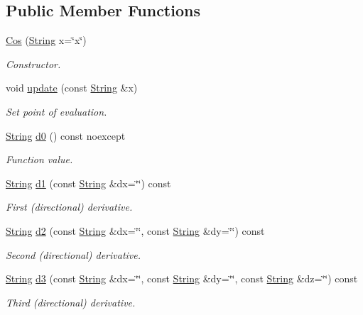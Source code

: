 \subsection*{Public Member Functions}
\begin{DoxyCompactItemize}
\item 
\hyperlink{structFunG_1_1stringify_1_1Cos_a6d3500463ccf52c1a7a8947ff69ffc65}{Cos} (\hyperlink{structFunG_1_1String}{String} x=\char`\"{}x\char`\"{})
\begin{DoxyCompactList}\small\item\em Constructor. \end{DoxyCompactList}\item 
void \hyperlink{structFunG_1_1stringify_1_1Cos_a1e225e068cc3748e773a8f1797828874}{update} (const \hyperlink{structFunG_1_1String}{String} \&x)
\begin{DoxyCompactList}\small\item\em Set point of evaluation. \end{DoxyCompactList}\item 
\hyperlink{structFunG_1_1String}{String} \hyperlink{structFunG_1_1stringify_1_1Cos_ae76c9cfac0792566d037fcbc6cebfa51}{d0} () const noexcept
\begin{DoxyCompactList}\small\item\em Function value. \end{DoxyCompactList}\item 
\hyperlink{structFunG_1_1String}{String} \hyperlink{structFunG_1_1stringify_1_1Cos_ab889dfe2a9346675e26fe3f25fedf3ce}{d1} (const \hyperlink{structFunG_1_1String}{String} \&dx=\char`\"{}\char`\"{}) const 
\begin{DoxyCompactList}\small\item\em First (directional) derivative. \end{DoxyCompactList}\item 
\hyperlink{structFunG_1_1String}{String} \hyperlink{structFunG_1_1stringify_1_1Cos_abae15833d1101b776e6d9513b0e4b91d}{d2} (const \hyperlink{structFunG_1_1String}{String} \&dx=\char`\"{}\char`\"{}, const \hyperlink{structFunG_1_1String}{String} \&dy=\char`\"{}\char`\"{}) const 
\begin{DoxyCompactList}\small\item\em Second (directional) derivative. \end{DoxyCompactList}\item 
\hyperlink{structFunG_1_1String}{String} \hyperlink{structFunG_1_1stringify_1_1Cos_af79e413b63373dfa71e0b80cf8968735}{d3} (const \hyperlink{structFunG_1_1String}{String} \&dx=\char`\"{}\char`\"{}, const \hyperlink{structFunG_1_1String}{String} \&dy=\char`\"{}\char`\"{}, const \hyperlink{structFunG_1_1String}{String} \&dz=\char`\"{}\char`\"{}) const 
\begin{DoxyCompactList}\small\item\em Third (directional) derivative. \end{DoxyCompactList}\end{DoxyCompactItemize}


